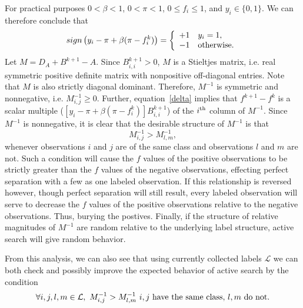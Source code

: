 \documentclass[12pt]{article}
\begin{document}
For practical purposes $0<\beta<1$, $0<\pi<1$, $0 \leq f_i \leq 1$, and $y_i \in \lbrace 0,1\rbrace$. We can therefore conclude that 
\begin{equation}
  sign\left(y_i-\pi+\beta (\pi - f^k_i)\right) = \left\lbrace \begin{array}{ll} +1 & y_i=1, \\ -1 & {\rm otherwise.} \end{array} \right.
\end{equation}
Let $M = D_A+B^{k+1}-A$. Since $B^{k+1}_{i,i}>0$, $M$ is a Stieltjes matrix, i.e. real symmetric positive definite matrix with nonpositive off-diagonal entries. Note that $M$ is also strictly diagonal dominant. Therefore, $M^{-1}$ is symmetric and nonnegative, i.e. $M^{-1}_{i,j} \ge 0$. Further, equation~\ref{delta} implies that $f^{k+1}-f^k$ is a scalar multiple ($\left[y_i-\pi+\beta (\pi - f^k_i)\right]B^{k+1}_{i,i}$) of the $i^{\rm th}$ column of $M^{-1}$. Since $M^{-1}$ is nonnegative, it is clear that the desirable structure of $M^{-1}$ is that
\begin{equation}
  M^{-1}_{i,j} > M^{-1}_{l,m},
\end{equation}
whenever observations $i$ and $j$ are of the same class and observations $l$ and $m$ are not. Such a condition will cause the $f$ values of the positive observations to be strictly greater than the $f$ values of the negative observations, effecting perfect separation with a few as one labeled observation. If this relationship is reversed however, though perfect separation will still result, every labeled observation will serve to decrease the $f$ values of the positive observations relative to the negative observations. Thus, burying the postives. Finally, if the structure of relative magnitudes of $M^{-1}$ are random relative to the underlying label structure, active search will give random behavior.  

From this analysis, we can also see that using currently collected labels $\mathcal{L}$ we can both check and possibly improve the expected behavior of active search by the condition
\begin{equation}
  \forall i,j,l,m \in \mathcal{L},~M^{-1}_{i,j} > M^{-1}_{l,m}~i,j~{\rm have~the~same~class,}~l,m~{\rm do~not.}
\end{equation}
\end{document}
